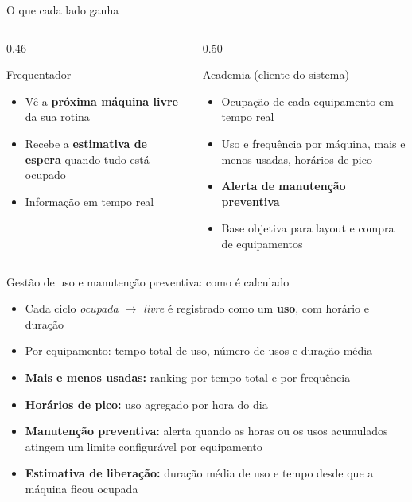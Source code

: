 \documentclass[aspectratio=169,11pt]{beamer}
\begin{document}
\begin{frame}[t]{O que cada lado ganha}
  \begin{columns}[T]
    \begin{column}{0.46\textwidth}
      \begin{block}{Frequentador}
        \small
        \begin{itemize}
          \item Vê a \textbf{próxima máquina livre} da sua rotina
          \item Recebe a \textbf{estimativa de espera} quando tudo está ocupado
          \item Informação em tempo real
        \end{itemize}
      \end{block}
    \end{column}
    \begin{column}{0.50\textwidth}
      \begin{block}{Academia (cliente do sistema)}
        \small
        \begin{itemize}
          \item Ocupação de cada equipamento em tempo real
          \item Uso e frequência por máquina, mais e menos usadas, horários de pico
          \item \textbf{Alerta de manutenção preventiva}
          \item Base objetiva para layout e compra de equipamentos
        \end{itemize}
      \end{block}
    \end{column}
  \end{columns}
\end{frame}

\begin{frame}[t]{Gestão de uso e manutenção preventiva: como é calculado}
  \small
  \begin{itemize}
    \item Cada ciclo \emph{ocupada $\rightarrow$ livre} é registrado como um \textbf{uso}, com horário e duração
    \item Por equipamento: tempo total de uso, número de usos e duração média
    \item \textbf{Mais e menos usadas:} ranking por tempo total e por frequência
    \item \textbf{Horários de pico:} uso agregado por hora do dia
    \item \textbf{Manutenção preventiva:} alerta quando as horas ou os usos acumulados atingem um limite configurável por equipamento
    \item \textbf{Estimativa de liberação:} duração média de uso e tempo desde que a máquina ficou ocupada
  \end{itemize}
\end{frame}
\end{document}
